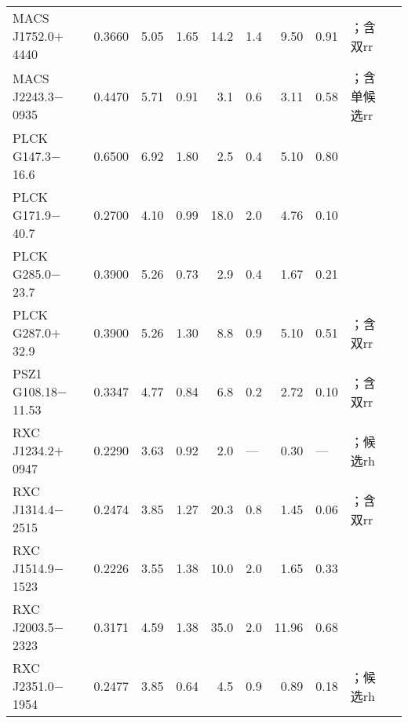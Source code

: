 \begin{ThreePartTable}
\begin{longtable}{lcccr@{$\,\pm\,$}lr@{$\,\pm\,$}lll}
MACS J1752.0$+$4440  & 0.3660 & 5.05 & 1.65 &  14.2 &  1.4\tnote{m} &  9.50 &  0.91 & \parencite{vanWeeren2012}；含双\acl{rr}  \\
MACS J2243.3$-$0935  & 0.4470 & 5.71 & 0.91 &   3.1 &  0.6\tnote{n} &  3.11 &  0.58 & \parencite{cantwell2016}；含单候选\acl{rr}  \\
PLCK G147.3$-$16.6   & 0.6500 & 6.92 & 1.80 &   2.5 &  0.4\tnote{o} &  5.10 &  0.80 & \parencite{vanWeeren2014}  \\
PLCK G171.9$-$40.7   & 0.2700 & 4.10 & 0.99 &  18.0 &  2.0 &  4.76 &  0.10 & \parencite{giacintucci2013}  \\
PLCK G285.0$-$23.7   & 0.3900 & 5.26 & 0.73 &   2.9 &  0.4\tnote{p} &  1.67 &  0.21 & \parencite{martinezAviles2016}  \\
PLCK G287.0$+$32.9   & 0.3900 & 5.26 & 1.30 &   8.8 &  0.9 &  5.10 &  0.51 & \parencite{bonafede2014a}；含双\acl{rr}  \\
PSZ1 G108.18$-$11.53 & 0.3347 & 4.77 & 0.84 &   6.8 &  0.2 &  2.72 &  0.10 & \parencite{deGasperin2015}；含双\acl{rr}  \\
RXC J1234.2$+$0947   & 0.2290 & 3.63 & 0.92 &   2.0 &  --- &  0.30 &  ---  & \parencite{govoni2012}；候选\acl{rh}  \\
RXC J1314.4$-$2515   & 0.2474 & 3.85 & 1.27 &  20.3 &  0.8 &  1.45 &  0.06 & \parencite{feretti2005}；含双\acl{rr}  \\
RXC J1514.9$-$1523   & 0.2226 & 3.55 & 1.38 &  10.0 &  2.0 &  1.65 &  0.33 & \parencite{giacintucci2011a}  \\
RXC J2003.5$-$2323   & 0.3171 & 4.59 & 1.38 &  35.0 &  2.0 & 11.96 &  0.68 & \parencite{giacintucci2009}  \\
RXC J2351.0$-$1954   & 0.2477 & 3.85 & 0.64 &   4.5 &  0.9\tnote{q} &  0.89 &  0.18 & \parencite{duchesne2017}；候选\acl{rh}  \\
\end{longtable}

\end{ThreePartTable}


